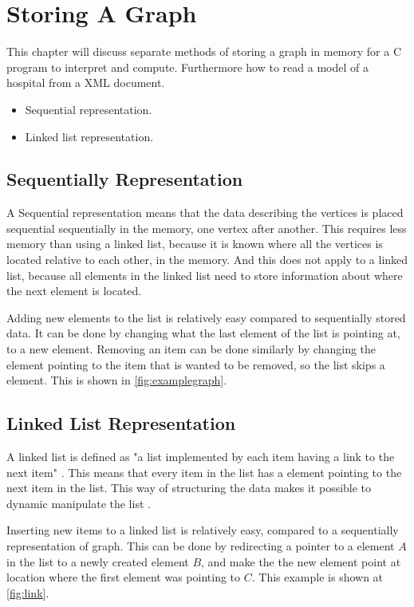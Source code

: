 \section{Storing A Graph}

This chapter will discuss separate methods of storing a graph in memory for a C program to interpret and compute. Furthermore how to read a model of a hospital from a XML document.

\begin{itemize}
	\item Sequential representation.
	\item Linked list representation.
\end{itemize} 


\subsection{Sequentially Representation}
A Sequential representation means that the data describing the vertices is placed sequential sequentially in the memory, one vertex after another. 
This requires less memory than using a linked list, because it is known where all the vertices is located relative to each other, in the memory. And this does not apply to a linked list, because all elements in the linked list need to store information about where the next element is located.

Adding new elements to the list is relatively easy compared to sequentially stored data.
It can be done by changing what the last element of the list is pointing at, to a new element.
Removing an item can be done similarly by changing the element pointing to the item that is wanted to be removed, so the list skips a element. This is shown in \cref{fig:examplegraph}.


\subsection{Linked List Representation}
\label{sub:list}
A linked list is defined as "a list implemented by each item having a link to the next item" \cite{linked_list_def}.
This means that every item in the list has a element pointing to the next item in the list. This way of structuring the data makes it possible to dynamic manipulate the list \cite{Linked_List}.

Inserting new items to a linked list is relatively easy, compared to a sequentially representation of graph. 
This can be done by redirecting a pointer to a element $A$ in the list to a newly created element $B$, and make the the new element point at location where the first element was pointing to $C$. This example is shown at \cref{fig:link}.

